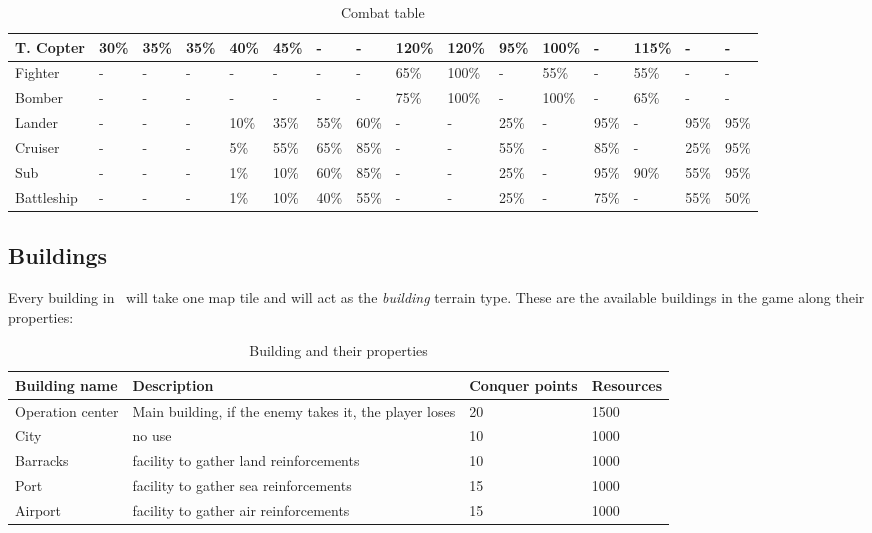 \begin{table}[H]
\begin{center}
{\begin{tabular}{| l | l | l | l | l | l | l | l | l | l | l | l | l | l | l | l |}
        \hline
        T. Copter & 30\% & 35\% & 35\% & 40\% & 45\% & - & - & 120\% & 120\% & 95\% & 100\% & - & 115\% & - & - \\ 
        \hline
        Fighter & - & - & - & - & - & - & - & 65\% & 100\% & - & 55\% & - & 55\% & - & - \\ 
        \hline
        Bomber & - & - & - & - & - & - & - & 75\% & 100\% & - & 100\% & - & 65\% & - & - \\ 
        \hline
        Lander & - & - & - & 10\% & 35\% & 55\% & 60\% & - & - & 25\% & - & 95\% & - & 95\% & 95\% \\ 
        \hline
        Cruiser & - & - & - & 5\% & 55\% & 65\% & 85\% & - & - & 55\% & - & 85\% & - & 25\% & 95\% \\ 
        \hline
        Sub & - & - & - & 1\% & 10\% & 60\% & 85\% & - & - & 25\% & - & 95\% & 90\% & 55\% & 95\% \\ 
        \hline
        Battleship & - & - & - & 1\% & 10\% & 40\% & 55\% & - & - & 25\% & - & 75\% & - & 55\% & 50\% \\ 
        \hline
    \end{tabular}
    }
    \end{center}
\caption{Combat table}
\end{table}

\subsection{Buildings}


Every building in \game\ will take one map tile and will act as the
\textit{building} terrain type. These are the available buildings in
the game along their properties:

\begin{table}[H]
    \label{tab:buildings}
    \begin{center}
    \begin{tabular}{| l | m{7cm}| m{3cm} | m{2.5cm} |}
        \hline
        \textbf{Building name} & \textbf{Description} & \textbf{Conquer points} & \textbf{Resources} \\
        \hline
        Operation center & Main building, if the enemy takes it, the player loses & 20 & 1500\\
        \hline
        City & no use & 10 & 1000 \\
        \hline
        Barracks & facility to gather land reinforcements & 10 & 1000 \\
        \hline
        Port & facility to gather sea reinforcements & 15 & 1000 \\
        \hline
        Airport & facility to gather air reinforcements & 15 & 1000 \\
        \hline
    \end{tabular}
    \end{center}
\caption{Building and their properties}
\end{table}

